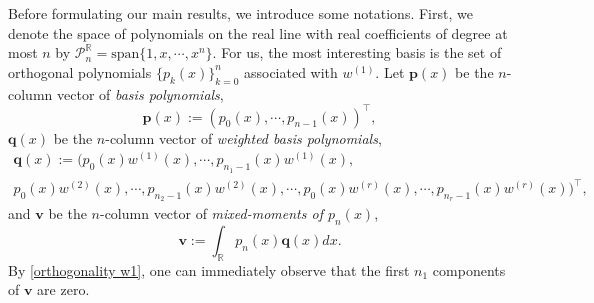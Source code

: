 \documentclass[a4paper,10pt,leqno]{amsart}
\numberwithin{equation}{section}
\newtheorem{lemma}[theorem]{Lemma}
\theoremstyle{remark}
\newcommand{\R}{\mathbb{R}}
\begin{document}

Before formulating our main results, we introduce some notations. 
First, we denote the space of polynomials on the real line with real coefficients of degree at most $n$ by $\mathcal{P}_n^{\R} = \mathrm{span}\{1, x, \cdots, x^n\}$.
For us, the most interesting basis is the set of orthogonal polynomials $\{p_k(x)\}_{k=0}^n$ associated with $w^{(1)}$.
Let $\bm{p}(x)$ be the $n$-column vector of \textit{basis polynomials},
\begin{equation} \label{defn of pi}
    \bm{p}(x):=(p_0(x),\cdots,p_{n-1}(x))^\top,
\end{equation}
$\bm{q}(x)$ be the $n$-column vector of \textit{weighted basis polynomials},
\begin{multline} \label{defn of phi}
    \bm{q}(x) := \bigg( p_0(x) w^{(1)}(x), \cdots, p_{n_1-1}(x) w^{(1)}(x),\\ p_0(x) w^{(2)}(x), \cdots, p_{n_2-1}(x) w^{(2)}(x), \boldsymbol{\cdots}, p_0 (x) w^{(r)}(x), \cdots, p_{n_r-1}(x) w^{(r)}(x)\bigg)^\top,
\end{multline}
and $\bm{v}$ be the $n$-column vector of \textit{mixed-moments of $p_n(x)$},
\begin{equation} \label{defn of v}
    \bm{v} := \int_{\R} p_n(x) \bm{q}(x) dx.
\end{equation}
By \eqref{orthogonality w1}, one can immediately observe that the first $n_1$ components of $\bm{v}$ are zero.
\end{document}
